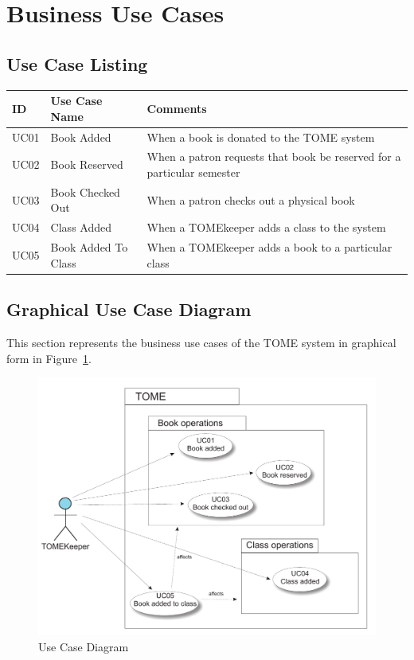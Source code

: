 \documentclass[12pt,titlepage]{article}
\begin{document}
\section{Business Use Cases}
\subsection{Use Case Listing}
\begin{tabular}{|p{}|p{}|p{}|}
	\hline
	\textbf{ID} & \textbf{Use Case Name} & \textbf{Comments} \\
	\hline
	UC01 & Book Added & When a book is donated to the TOME system \\
	\hline
	UC02 & Book Reserved & When a patron requests that book be reserved for a particular semester \\
	\hline
	UC03 & Book Checked Out & When a patron checks out a physical book \\
	\hline
	UC04 & Class Added & When a TOMEkeeper adds a class to the system \\
	\hline
	UC05 & Book Added To Class & When a TOMEkeeper adds a book to a particular class \\
	\hline
\end{tabular}
\subsection{Graphical Use Case Diagram}
This section represents the business use cases of the TOME system in graphical form in Figure~\ref{usecase}.
\begin{figure}[h]
	\includegraphics[width=\textwidth]{GraphicalUseCaseDiagram}
	\caption{Use Case Diagram}
	\label{usecase}
\end{figure}
\end{document}
